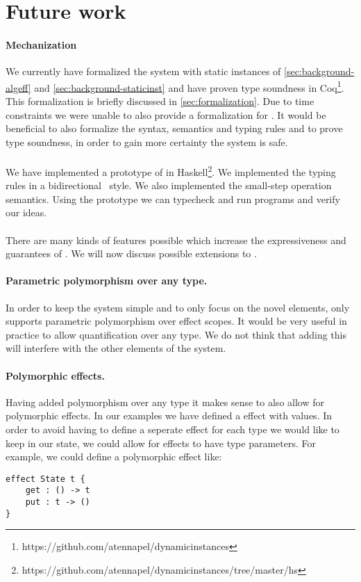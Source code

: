\section{Future work}

\paragraph{Mechanization}
We currently have formalized the system with static instances of \cref{sec:background-algeff} and \cref{sec:background-staticinst} and have proven type soundness in Coq\footnote{https://github.com/atennapel/dynamicinstances}.
This formalization is briefly discussed in \cref{sec:formalization}.
Due to time constraints we were unable to also provide a formalization for \lang{}.
It would be beneficial to also formalize the syntax, semantics and typing rules \lang{} and to prove type soundness, in order to gain more certainty the system is safe.
\\\\
We have implemented a prototype of \lang{} in Haskell\footnote{https://github.com/atennapel/dynamicinstances/tree/master/hs}.
We implemented the typing rules in a bidirectional~\autocite{bidirectionaltyping} style.
We also implemented the small-step operation semantics.
Using the prototype we can typecheck and run \lang{} programs and verify our ideas.
\\\\
There are many kinds of features possible which increase the expressiveness and guarantees of \lang{}.
We will now discuss possible extensions to \lang{}.

\paragraph{Parametric polymorphism over any type.}
In order to keep the system simple and to only focus on the novel elements, \lang{} only supports parametric polymorphism over effect scopes.
It would be very useful in practice to allow quantification over any type.
We do not think that adding this will interfere with the other elements of the system.

\paragraph{Polymorphic effects.}
Having added polymorphism over any type it makes sense to also allow for polymorphic effects.
In our examples we have defined a  effect with  values.
In order to avoid having to define a seperate effect for each type we would like to keep in our state, we could allow for effects to have type parameters.
For example, we could define a polymorphic  effect like:
\begin{verbatim}
effect State t {
	get : () -> t
	put : t -> ()
}
\end{verbatim}


